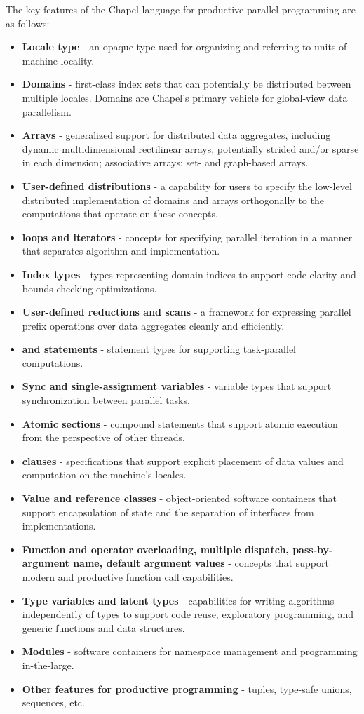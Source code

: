 The key features of the Chapel language for productive parallel programming are as 
follows: 
\begin{itemize}
\item {\bf Locale type} - an opaque type used for organizing and referring to 
units of machine locality.
\item {\bf Domains} - first-class index sets that can potentially be distributed 
between multiple locales.  Domains are Chapel's primary vehicle for global-view 
data parallelism.
\item {\bf Arrays} - generalized support for distributed data aggregates, including 
dynamic multidimensional rectilinear arrays, potentially strided and/or sparse 
in each dimension; associative arrays; set- and graph-based arrays.
\item {\bf User-defined distributions} - a capability for users to specify the 
low-level distributed implementation of domains and arrays orthogonally 
to the computations that operate on these concepts.
\item {\bf {} loops and iterators} - concepts for specifying parallel 
iteration in a manner that separates algorithm and implementation.
\item {\bf Index types} - types representing domain indices to support code 
clarity and bounds-checking optimizations.    
\item {\bf User-defined reductions and scans} - a framework for expressing parallel 
prefix operations over data aggregates cleanly and efficiently.
\item {\bf {} and  statements} - statement types for 
supporting task-parallel computations.
\item {\bf Sync and single-assignment variables} - variable types that support 
synchronization between parallel tasks.
\item {\bf Atomic sections} - compound statements that support atomic execution 
from the perspective of other threads.
\item {\bf {} clauses} - specifications that support explicit placement of 
data values and computation on the machine's locales.
\item {\bf Value and reference classes} - object-oriented software containers 
that support encapsulation of state and the separation of interfaces from 
implementations.
\item {\bf Function and operator overloading, multiple dispatch, pass-by-argument name, 
default argument values} - concepts that support modern and productive function call 
capabilities.
\item {\bf Type variables and latent types} - capabilities for writing algorithms 
independently of types to support code reuse, exploratory programming, and 
generic functions and data structures.
\item {\bf Modules} - software containers for namespace management and programming 
in-the-large.
\item {\bf Other features for productive programming} - tuples, type-safe unions, 
sequences, etc.
\end{itemize}



